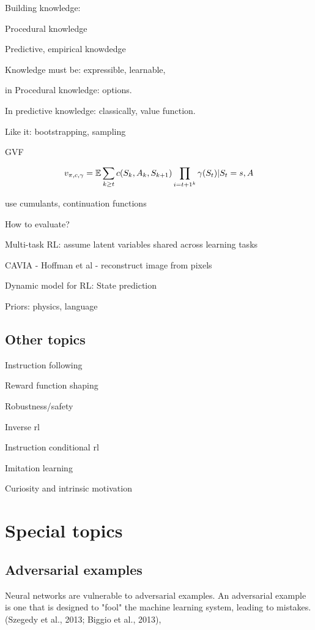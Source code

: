 \documentclass[english]{article}
\begin{document}
Building knowledge:

Procedural knowledge

Predictive, empirical knowdedge

Knowledge must be: expressible, learnable, 

in Procedural knowledge: options.

In predictive knowledge: classically, value function.

Like it: bootstrapping, sampling

GVF

$$
v_{\pi,c,\gamma}
= 
\mathbb{E}
\sum_{k\ge t}
c(S_k,A_k,S_{k+1})
\prod_{i=t+1^k}
\gamma(S_{t})|
S_t=s,
A
$$

use cumulants, continuation functions

How to evaluate?

\item Multi-task RL: assume latent variables shared across learning tasks

CAVIA - Hoffman et al - reconstruct image from pixels

\item 

Dynamic model for RL: State prediction

Priors: physics, language

\eenum

\subsection{Other topics}
%
\benum
\item Instruction following
\item Reward function shaping
\item Robustness/safety
\item  Inverse rl
\item Instruction conditional rl
\item  Imitation learning
\item Curiosity and intrinsic motivation
\eenum 

\section{Special topics}
%
\subsection{Adversarial examples}
%
\bitem
\item Neural networks are vulnerable to adversarial examples. An adversarial example is one that is designed to "fool" the machine learning system, leading to mistakes. (Szegedy et al., 2013; Biggio et al., 2013),
\end{document}
